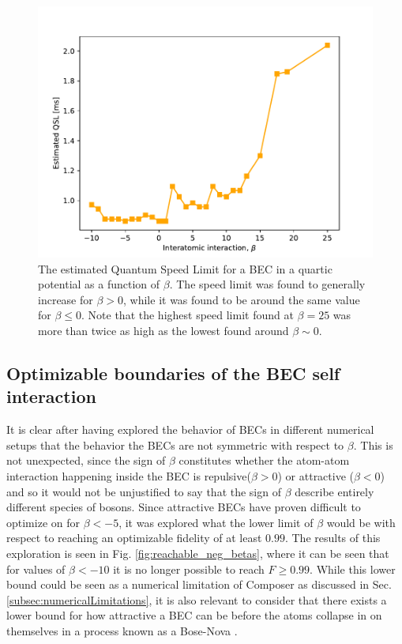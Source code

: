 \documentclass[a4paper, twocolumn]{revtex4-1}
\begin{document}
\begin{figure}[h]
	\includegraphics[width=\columnwidth]{graphics/exploration/QSL.pdf}
	\caption{The estimated Quantum Speed Limit for a BEC in a quartic potential as a function of $\beta$. The speed limit was found to generally increase for $\beta>0$, while it was found to be around the same value for $\beta\leq0$. Note that the highest speed limit found at $\beta=25$ was more than twice as high as the lowest found around $\beta \sim 0$.}
	\label{fig:QSL}
\end{figure}

\subsection{Optimizable boundaries of the BEC self interaction}\label{subsec:optimizable-boundaries-of-beta}

It is clear after having explored the behavior of BECs in different numerical setups that the behavior the BECs are not symmetric with respect to $\beta$. This is not unexpected, since the sign of $\beta$ constitutes whether the atom-atom interaction happening inside the BEC is repulsive($\beta>0$) or attractive ($\beta<0$) and so it would not be unjustified to say that the sign of $\beta$ describe entirely different species of bosons. Since attractive BECs have proven difficult to optimize on for $\beta<-5$, it was explored what the lower limit of $\beta$ would be with respect to reaching an optimizable fidelity of at least $0.99$. The results of this exploration is seen in Fig. \ref{fig:reachable_neg_betas}, where it can be seen that for values of $\beta<-10$ it is no longer possible to reach $F\geq0.99$. While this lower bound could be seen as a numerical limitation of Composer as discussed in Sec. \ref{subsec:numericalLimitations}, it is also relevant to consider that there exists a lower bound for how attractive a BEC can be before the atoms collapse in on themselves in a process known as a Bose-Nova \cite{Donley2001}.
\end{document}
